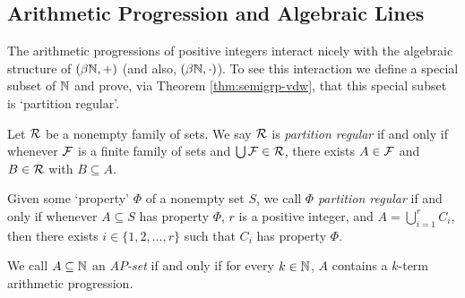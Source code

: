 \subsection{Arithmetic Progression and Algebraic Lines}
The arithmetic progressions of positive integers interact nicely with the algebraic structure of $(\beta \mathbb{N}, +)$ (and also, $(\beta \mathbb{N}, \cdot)$). 
To see this interaction we define a special subset of $\mathbb{N}$ and prove, via Theorem \ref{thm:semigrp-vdw}, that this special subset is `partition regular'.%

\begin{defn}
  Let $\mathcal{R}$ be a nonempty family of sets.
  We say $\mathcal{R}$ is \emph{partition regular} if and only if whenever $\mathcal{F}$ is a finite family of sets and $\bigcup \mathcal{F} \in \mathcal{R}$, there exists $A \in \mathcal{F}$ and $B \in \mathcal{R}$ with $B \subseteq A$.
\end{defn}
\begin{rmk}
  Given some `property' $\Phi$ of a nonempty set $S$, we call $\Phi$ \emph{partition regular} if and only if whenever $A \subseteq S$ has property $\Phi$, $r$ is a positive integer, and $A = \bigcup_{i=1}^r C_i$, then there exists $i \in \{1, 2, \ldots, r\}$ such that $C_i$ has property $\Phi$.
\end{rmk}

\begin{defn}
  We call $A \subseteq \mathbb{N}$ an \emph{$AP$-set} if and only if for every $k \in \mathbb{N}$, $A$ contains a $k$-term arithmetic progression.
\end{defn}

